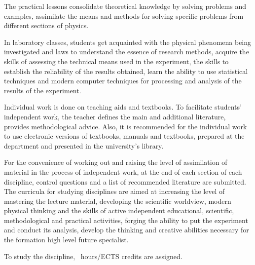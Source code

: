 \documentclass{rnp}
\begin{document}
The practical lessons consolidate theoretical knowledge by solving problems and examples, assimilate the means and methods for solving specific problems from different sections of physics.

In laboratory classes, students get acquainted with the physical phenomena being investigated and laws to understand the essence of research methods, acquire the skills of assessing the technical means used in the experiment, the skills to establish the reliability of the results obtained, learn the ability to use statistical techniques and modern computer techniques for processing and analysis of the results of the experiment.

Individual work is done on teaching aids and textbooks. To facilitate students' independent work, the teacher defines the main and additional literature, provides methodological advice. Also, it is recommended for the individual work to use electronic versions of textbooks, manuals and textbooks, prepared at the department and presented in the university's library.

For the convenience of working out and raising the level of assimilation of material in the process of independent work, at the end of each section of each discipline, control questions and a list of recommended literature are submitted. The curricula for studying disciplines are aimed at increasing the level of mastering the lecture material, developing the scientific worldview, modern physical thinking and the skills of active independent educational, scientific, methodological and practical activities, forging the ability to put the experiment and conduct its analysis, develop the thinking and creative abilities necessary for the formation high level future specialist.


To study the discipline, \godyny~hours/\kredits ECTS credits are assigned.
\end{document}
